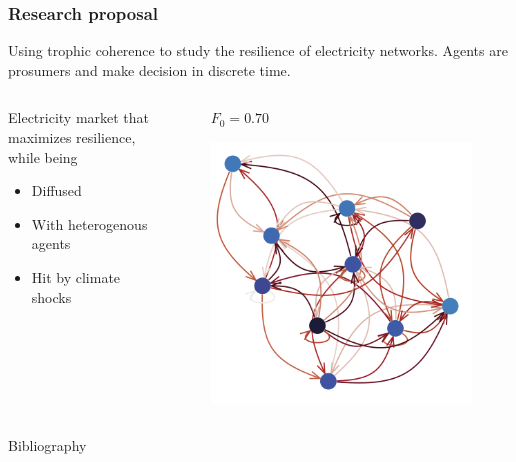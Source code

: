 \documentclass{beamer}
\begin{document}
\begin{frame}
    \frametitle{Research proposal}
    Using trophic coherence to study the resilience of electricity networks. Agents are prosumers and make decision in discrete time.


    \begin{columns}
        \begin{column}{.49\textwidth}
            Electricity market that maximizes resilience, while being
            \begin{itemize}
                \item Diffused
                \item With heterogenous agents
                \item Hit by climate shocks
            \end{itemize}
        \end{column}
        \begin{column}{.49\textwidth}
            \begin{figure}
                \textbf{$F_0 = 0.70$}\par\medskip
                \includegraphics[width=\linewidth,height=0.4\textheight,keepaspectratio]{../../plots/presentations/electricity.png}
            \end{figure}
        \end{column}
    \end{columns}
\end{frame}


\begin{frame}[allowframebreaks]{Bibliography}
    
    
\end{frame}
\end{document}
